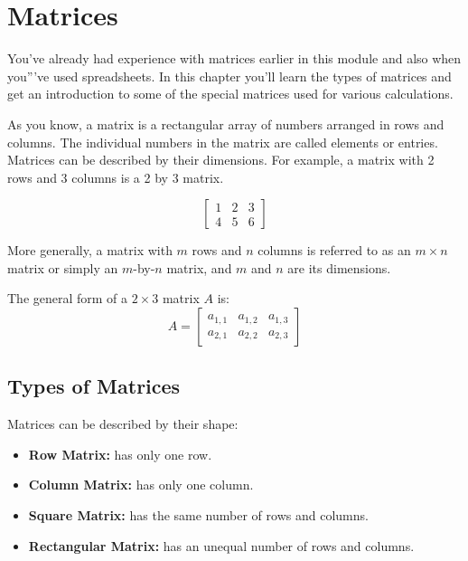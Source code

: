 \chapter{Matrices}
You've already had experience with matrices earlier in this module and also when you'''ve used spreadsheets. In this chapter you'll learn the types of matrices and get an introduction to some of the special matrices used for various calculations. 

As you know, a matrix is a rectangular array of numbers arranged in rows and columns. The individual numbers in the matrix are called elements or entries. Matrices can be described by their dimensions. For example, a matrix with 2 rows and 3 columns is a 2 by 3 matrix.

$$\begin{bmatrix}
1 & 2 & 3\\
4 & 5 & 6 
\end{bmatrix}
$$

More generally, a matrix with $m$ rows and $n$ columns is referred to as an $m \times n$ matrix or simply an $m$-by-$n$ matrix, and $m$ and $n$ are its dimensions.

The general form of a $2 \times 3$ matrix $A$ is:
$$
A = \begin{bmatrix}
a_{1,1} & a_{1,2} & a_{1,3} \\
a_{2,1} & a_{2,2} & a_{2,3}
\end{bmatrix}
$$

\section{Types of Matrices}
Matrices can be described by their shape:
\begin{itemize}
	\item \textbf{Row Matrix:} has only one row.
	\item \textbf{Column Matrix:} has only one column.
	\item \textbf{Square Matrix:} has the same number of rows and columns.
	\item \textbf{Rectangular Matrix:} has an unequal number of rows and columns.
\end{itemize}

